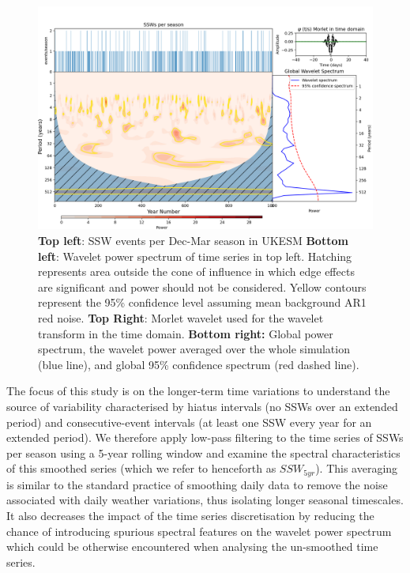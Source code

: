 \documentclass[wcd, manuscript]{copernicus}
\begin{document}
\begin{center}
\begin{figure}[h!]
\noindent\includegraphics[width = 0.8\linewidth]{new_changed_figures/SSW_wavelet_new_levels.png}
\caption{\textbf{Top left}: SSW events per Dec-Mar season in UKESM \textbf{Bottom left}: Wavelet power spectrum of time series in top left. Hatching represents area outside the cone of influence in which edge effects are significant and power should not be considered. Yellow contours represent the 95\% confidence level assuming mean background AR1 red noise. \textbf{Top Right}: Morlet wavelet used for the wavelet transform in the time domain. \textbf{Bottom right:} Global power spectrum, the wavelet power averaged over the whole simulation (blue line), and global 95\% confidence spectrum (red dashed line).}
\label{fig3}
\end{figure}
\end{center}


The focus of this study is on the longer-term time variations to understand the source of variability characterised by hiatus intervals (no SSWs over an extended period) and consecutive-event intervals (at least one SSW every year for an extended period). We therefore apply low-pass filtering to the time series of SSWs per season using a 5-year rolling window and examine the spectral characteristics of this smoothed series (which we refer to henceforth as $SSW_{5yr}$). This averaging is similar to the standard practice of smoothing daily data to remove the noise associated with daily weather variations, thus isolating longer seasonal timescales. It also decreases the impact of the time series discretisation by reducing the chance of introducing spurious spectral features on the wavelet power spectrum which could be otherwise encountered when analysing the un-smoothed time series.  
\end{document}
